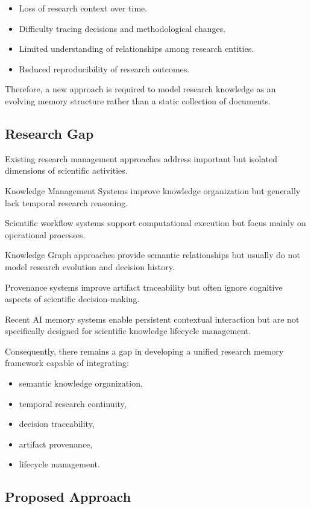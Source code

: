 \begin{itemize}
\item Loss of research context over time.
\item Difficulty tracing decisions and methodological changes.
\item Limited understanding of relationships among research entities.
\item Reduced reproducibility of research outcomes.
\end{itemize}

Therefore, a new approach is required to model research knowledge as an evolving memory structure rather than a static collection of documents.

\subsection{Research Gap}

Existing research management approaches address important but isolated dimensions of scientific activities.

Knowledge Management Systems improve knowledge organization but generally lack temporal research reasoning.

Scientific workflow systems support computational execution but focus mainly on operational processes.

Knowledge Graph approaches provide semantic relationships but usually do not model research evolution and decision history.

Provenance systems improve artifact traceability but often ignore cognitive aspects of scientific decision-making.

Recent AI memory systems enable persistent contextual interaction but are not specifically designed for scientific knowledge lifecycle management.

Consequently, there remains a gap in developing a unified research memory framework capable of integrating:

\begin{itemize}
\item semantic knowledge organization,
\item temporal research continuity,
\item decision traceability,
\item artifact provenance,
\item lifecycle management.
\end{itemize}


\subsection{Proposed Approach}

